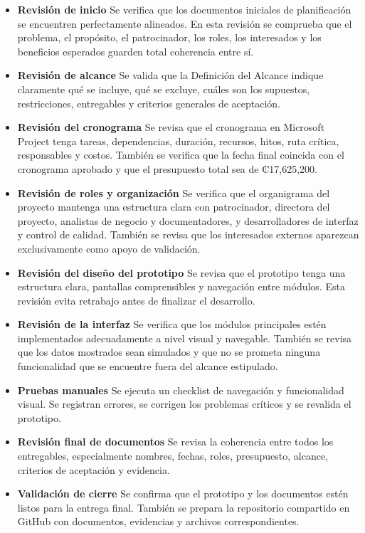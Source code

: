 \documentclass[11pt,spanish]{article}
\begin{document}
\begin{itemize}[leftmargin=*]
    \item \textbf{Revisión de inicio} Se verifica que los documentos iniciales de planificación se encuentren perfectamente alineados. En esta revisión se comprueba que el problema, el propósito, el patrocinador, los roles, los interesados y los beneficios esperados guarden total coherencia entre sí.
    \item \textbf{Revisión de alcance} Se valida que la Definición del Alcance indique claramente qué se incluye, qué se excluye, cuáles son los supuestos, restricciones, entregables y criterios generales de aceptación.
    \item \textbf{Revisión del cronograma} Se revisa que el cronograma en Microsoft Project tenga tareas, dependencias, duración, recursos, hitos, ruta crítica, responsables y costos. También se verifica que la fecha final coincida con el cronograma aprobado y que el presupuesto total sea de ₡17,625,200.
    \item \textbf{Revisión de roles y organización} Se verifica que el organigrama del proyecto mantenga una estructura clara con patrocinador, directora del proyecto, analistas de negocio y documentadores, y desarrolladores de interfaz y control de calidad. También se revisa que los interesados externos aparezcan exclusivamente como apoyo de validación.
    \item \textbf{Revisión del diseño del prototipo} Se revisa que el prototipo tenga una estructura clara, pantallas comprensibles y navegación entre módulos. Esta revisión evita retrabajo antes de finalizar el desarrollo.
    \item \textbf{Revisión de la interfaz} Se verifica que los módulos principales estén implementados adecuadamente a nivel visual y navegable. También se revisa que los datos mostrados sean simulados y que no se prometa ninguna funcionalidad que se encuentre fuera del alcance estipulado.
    \item \textbf{Pruebas manuales} Se ejecuta un checklist de navegación y funcionalidad visual. Se registran errores, se corrigen los problemas críticos y se revalida el prototipo.
    \item \textbf{Revisión final de documentos} Se revisa la coherencia entre todos los entregables, especialmente nombres, fechas, roles, presupuesto, alcance, criterios de aceptación y evidencia.
    \item \textbf{Validación de cierre} Se confirma que el prototipo y los documentos estén listos para la entrega final. También se prepara la repositorio compartido en GitHub con documentos, evidencias y archivos correspondientes.
\end{itemize}
\end{document}

